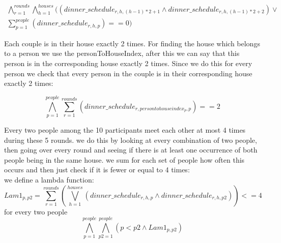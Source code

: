 \documentclass[12pt]{article}
\begin{document}
\[ \begin{array}{c}
\bigwedge_{r = 1}^{rounds} \bigwedge_{h = 1}^{houses} ( \left({dinner\_schedule_{r,h,(h-1)*2+1} } \land {dinner\_schedule_{r,h,(h-1)*2+2}} \right) \lor \\ 
\sum_{p=1}^{people} \left( {dinner\_schedule_{r,h,p}} \right) == 0 )
\end{array} \]


Each couple is in their house exactly 2 times.
For finding the house which belongs to a person we use the personToHouseIndex, after this we can say that this person is in the corresponding house exactly 2 times. Since we do this for every person we check that every person in the couple is in their corresponding house exactly 2 times:

\[ \bigwedge_{p=1}^{people} \sum_{r=1}^{rounds} \left( {dinner\_schedule_{r,persontohouseindex_{p},p}} \right) == 2  \]

Every two people among the 10 participants meet each other at most 4 times during these 5 rounds. we do this by looking at every combination of two people, then going over every round and seeing if there is at least one occurrence of both people being in the same house. we sum for each set of people how often this occurs and then just check if it is fewer or equal to 4 times:\\

 we define a lambda function:
\[Lam1_{p,p2} = \sum_{r=1}^{rounds} \left( \bigvee_{h = 1}^{houses} \left( dinner\_schedule_{r,h,p} \land dinner\_schedule_{r,h,p2} \right)  \right) <= 4\]
for every two people
\[ \bigwedge_{p=1}^{people} \bigwedge_{p2=1}^{people} \left( p <p2 \land Lam1_{p,p2}\right)  \]



\end{document}
